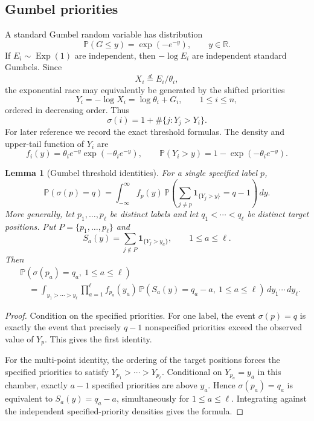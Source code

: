 \documentclass[11pt]{article}
\newtheorem{lemma}[theorem]{Lemma}
\theoremstyle{remark}
\newcommand{\Pp}{\mathbb P}
\newcommand{\Rr}{\mathbb R}
\newcommand{\one}{\mathbf 1}
\newcommand{\Exp}{\operatorname{Exp}}
\newcommand{\dd}{\,d}
\begin{document}
\subsection{Gumbel priorities}\label{subsec:gumbel-priorities}
A standard Gumbel random variable has distribution
\[
        \Pp(G\le y)=\exp(-e^{-y}),
        \qquad y\in\Rr .
\]
If \(E_i\sim\Exp(1)\) are independent, then \(-\log E_i\) are independent standard Gumbels.  Since
\[
        X_i\stackrel{d}=E_i/\theta_i,
\]
the exponential race may equivalently be generated by the shifted priorities
\[
        Y_i=-\log X_i=\log\theta_i+G_i,
        \qquad 1\le i\le n,
\]
ordered in decreasing order.  Thus
\[
        \sigma(i)=1+\#\{j:Y_j>Y_i\}.
\]
For later reference we record the exact threshold formulas.  The density and upper-tail function of \(Y_i\) are
\[
        f_i(y)=\theta_i e^{-y}\exp(-\theta_i e^{-y}),
        \qquad
        \Pp(Y_i>y)=1-\exp(-\theta_i e^{-y}).
\]

\begin{lemma}[Gumbel threshold identities]\label{lem:gumbel-threshold-identities}
For a single specified label \(p\),
\[
        \Pp(\sigma(p)=q)
        =\int_{-\infty}^{\infty}
        f_p(y)\,
        \Pp\left(\sum_{j\ne p}\one_{\{Y_j>y\}}=q-1\right)\dd y .
\]
More generally, let \(p_1,\ldots,p_\ell\) be distinct labels and let
\(q_1<\cdots<q_\ell\) be distinct target positions.  Put
\(P=\{p_1,\ldots,p_\ell\}\) and
\[
        S_a(y)=\sum_{j\notin P}\one_{\{Y_j>y_a\}},
        \qquad 1\le a\le\ell .
\]
Then
\[
\begin{aligned}
&\Pp(\sigma(p_a)=q_a,\ 1\le a\le\ell) \\
&\quad=\int_{y_1>\cdots>y_\ell}
        \prod_{a=1}^\ell f_{p_a}(y_a)\,
        \Pp(S_a(y)=q_a-a,\ 1\le a\le\ell)
        \dd y_1\cdots\dd y_\ell .
\end{aligned}
\]
\end{lemma}

\begin{proof}
Condition on the specified priorities.  For one label, the event
\(\sigma(p)=q\) is exactly the event that precisely \(q-1\) nonspecified
priorities exceed the observed value of \(Y_p\).  This gives the first
identity.

For the multi-point identity, the ordering of the target positions forces the
specified priorities to satisfy \(Y_{p_1}>\cdots>Y_{p_\ell}\).  Conditional on
\(Y_{p_a}=y_a\) in this chamber, exactly \(a-1\) specified priorities are above
\(y_a\).  Hence \(\sigma(p_a)=q_a\) is equivalent to
\(S_a(y)=q_a-a\), simultaneously for \(1\le a\le\ell\).  Integrating against the
independent specified-priority densities gives the formula.
\end{proof}
\end{document}
